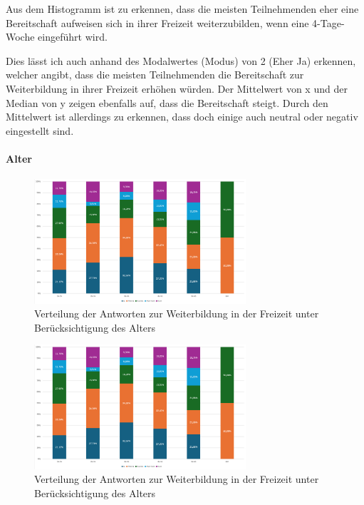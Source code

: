 Aus dem Histogramm ist zu erkennen, dass die meisten Teilnehmenden eher 
eine Bereitschaft aufweisen sich in ihrer Freizeit weiterzubilden, 
wenn eine 4-Tage-Woche eingeführt wird.

Dies lässt ich auch anhand des Modalwertes (Modus) von 2 (Eher Ja) erkennen, welcher angibt, dass die
meisten Teilnehmenden die Bereitschaft zur Weiterbildung in ihrer Freizeit erhöhen würden.
Der Mittelwert von x und der Median von y zeigen ebenfalls auf, dass die Bereitschaft steigt.
Durch den Mittelwert ist allerdings zu erkennen, dass doch einige auch neutral oder negativ 
eingestellt sind.

\paragraph*{Alter}

\begin{figure}
    \centering
    \includegraphics[width=0.7\textwidth]{04_Artefakte/01_Abbildungen/hypothese_9/weiterbildung_alter.png}
    \caption{Verteilung der Antworten zur Weiterbildung in der Freizeit unter Berücksichtigung des Alters}
    \label{fig:bereitschaft_weiterbildung_alter}
\end{figure}

\begin{figure}
    \centering
    \includegraphics[width=0.7\textwidth]{04_Artefakte/01_Abbildungen/hypothese_9/weiterbildung_alter.png}
    \caption{Verteilung der Antworten zur Weiterbildung in der Freizeit unter Berücksichtigung des Alters}
    \label{fig:bereitschaft_weiterbildung_alter}
\end{figure}

